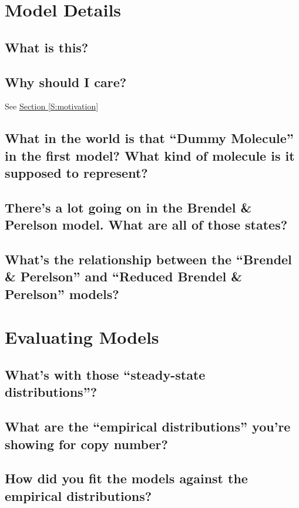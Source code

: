 \documentclass[preprint,12pt]{elsarticle}
\begin{document}
\section{Model Details}

\subsection{What is this?}

\subsection{Why should I care?}

	See \hyperref[S:motivation]{Section \ref{S:motivation}}

\subsection{What in the world is that ``Dummy Molecule'' in the first model? What kind of molecule is it supposed to represent?}

\subsection{There's a lot going on in the Brendel \& Perelson model. What are all of those states?}

\subsection{What's the relationship between the ``Brendel \& Perelson'' and ``Reduced Brendel \& Perelson'' models?}

\section{Evaluating Models}

\subsection{What's with those ``steady-state distributions''?}

\subsection{What are the ``empirical distributions'' you're showing for copy number?} 

\subsection{How did you fit the models against the empirical distributions?}
\end{document}
